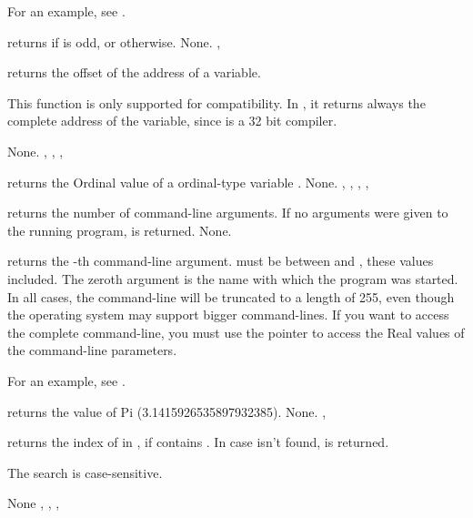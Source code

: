 \documentclass{report}
\begin{document}
For an example, see .

{ returns  if  is odd, or  otherwise.}
{None.}
{, }


\html{}

{ returns the offset of the address of a variable. 

This function is only supported for compatibility. In \fpc, it 
returns always the complete address of the variable, since \fpc is a 32 bit 
compiler.
}
{None.}
{, , , }


\html{}


{ returns the Ordinal value of a ordinal-type variable .}
{None.}
{, , , , }

\html{}

{ returns the number of command-line arguments. If no
arguments were given to the running program,  is returned.
}
{None.}
{}


\html{}

{ returns the -th command-line argument.  must
be between  and , these values included.
The zeroth argument is the name with which the program was started.
}
{ In all cases, the command-line will be truncated to a length of 255,
even though the operating system may support bigger command-lines. If you
want to access the complete command-line, you must use the  pointer
to access the Real values of the command-line parameters.}
{}

For an example, see .

{ returns the value of Pi (3.1415926535897932385).}
{None.}
{, }


\html{}

{ returns the index of  in , if  contains
. In case  isn't found,  is returned.

The search is case-sensitive.
}
{None}
{, , , }
\end{document}
